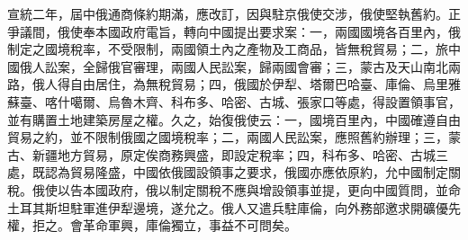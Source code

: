 \begin{pinyinscope}
宣統二年，屆中俄通商條約期滿，應改訂，因與駐京俄使交涉，俄使堅執舊約。正爭議間，俄使奉本國政府電旨，轉向中國提出要求案：一，兩國國境各百里內，俄制定之國境稅率，不受限制，兩國領土內之產物及工商品，皆無稅貿易；二，旅中國俄人訟案，全歸俄官審理，兩國人民訟案，歸兩國會審；三，蒙古及天山南北兩路，俄人得自由居住，為無稅貿易；四，俄國於伊犁、塔爾巴哈臺、庫倫、烏里雅蘇臺、喀什噶爾、烏魯木齊、科布多、哈密、古城、張家口等處，得設置領事官，並有購置土地建築房屋之權。久之，始復俄使云：一，國境百里內，中國確遵自由貿易之約，並不限制俄國之國境稅率；二，兩國人民訟案，應照舊約辦理；三，蒙古、新疆地方貿易，原定俟商務興盛，即設定稅率；四，科布多、哈密、古城三處，既認為貿易隆盛，中國依俄國設領事之要求，俄國亦應依原約，允中國制定關稅。俄使以告本國政府，俄以制定關稅不應與增設領事並提，更向中國質問，並命土耳其斯坦駐軍進伊犁邊境，遂允之。俄人又遣兵駐庫倫，向外務部邀求開礦優先權，拒之。會革命軍興，庫倫獨立，事益不可問矣。


\end{pinyinscope}